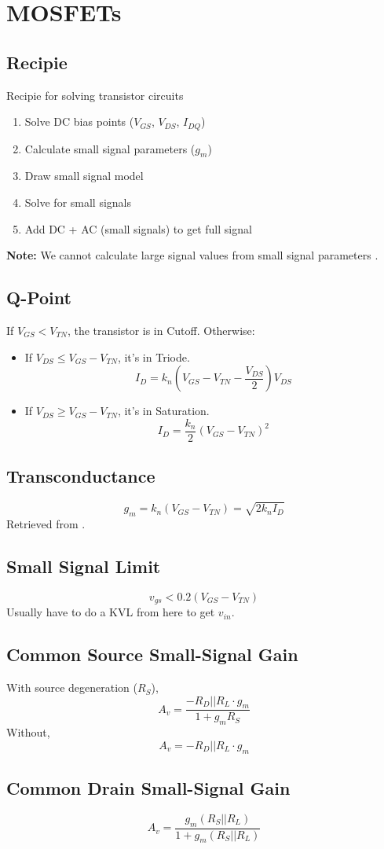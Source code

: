 \chapter{MOSFETs}
\section{Recipie}
Recipie for solving transistor circuits
\begin{enumerate}
	\item Solve DC bias points ($V_{GS}$, $V_{DS}$, $I_{DQ}$)
	\item Calculate small signal parameters ($g_m$)
	\item Draw small signal model
	\item Solve for small signals
	\item Add DC + AC (small signals) to get full signal
\end{enumerate}
\textbf{Note:} We cannot calculate large signal values from small signal parameters \cite{ulaby}.

\section{Q-Point}
If $V_{GS} < V_{TN}$, the transistor is in Cutoff. Otherwise:
\begin{itemize}
	\item If $V_{DS} \leq V_{GS}-V_{TN}$, it's in Triode.
	\[I_{D}=k_n\left(V_{GS}-V_{TN}-\frac{V_{DS}}{2}\right)V_{DS}\]
	\item If $V_{DS} \geq V_{GS}-V_{TN}$, it's in Saturation.
	\[I_{D}=\frac{k_n}{2}\left(V_{GS}-V_{TN}\right)^2\]
\end{itemize}

\section{Transconductance}
\begin{equation}
g_m = k_n\left(V_{GS}-V_{TN}\right) = \sqrt{2k_n I_{D}} \label{eq:dis}
\end{equation}
Retrieved from .


\section{Small Signal Limit}
\[v_{gs}<0.2\left(V_{GS}-V_{TN}\right)\]
Usually have to do a KVL from here to get $v_{in}$.


\section{Common Source Small-Signal Gain}
	With source degeneration ($R_S$),
	\[A_v=\frac{-R_D||R_L \cdot g_m}{1+g_m R_S}\]
	Without,
	\[A_v=-R_D||R_L\cdot g_m\]

\section{Common Drain Small-Signal Gain}
	\[A_v=\frac{g_m\left(R_S||R_L\right)}{1+g_m\left(R_S||R_L\right)} \]
